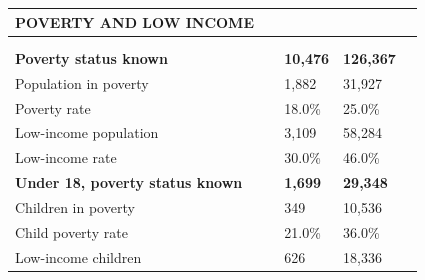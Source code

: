 \documentclass[9pt]{report}
\begin{document}
\vspace{12pt}
\setlength{\tabcolsep}{.01in} %
\begin{tabular}{p{.10in}p{.10in}p{.10in}p{3.7in}>{\hfill}p{.85in}>{\hfill}p{.85in}>{\hfill}p{.85in}>{\hfill}p{.85in}p{0.1in}}
\multicolumn{9}{l}{\parbox{7.1in}{\raggedright{\large{\strut\textbf{POVERTY AND LOW INCOME}\strut}}}} \\ 
\hline
\multicolumn{4}{l}{\parbox{3.5in}{\raggedright{\textbf{}}}} & \multicolumn{1}{r}{\parbox{.85in}{\strut\raggedleft{\textbf{}\strut}}} & \multicolumn{1}{r}{\parbox{.85in}{\strut\raggedleft{\textbf{}\strut}}} & \multicolumn{1}{r}{\parbox{.85in}{\strut{}}} & \multicolumn{1}{r}{\parbox{.85in}{\strut{}}} & \\ 
\multicolumn{9}{l}{} \\ 
\multicolumn{4}{l}{\parbox{3.5in}{\strut\raggedright{\textbf{Poverty status known}\strut}}} & \textbf{} & \textbf{} & \textbf{10,476} & \textbf{126,367} & \textbf{} \\ 
\multicolumn{4}{l}{\parbox{3.6in}{\strut\raggedright{{Population in poverty}}\strut}} &  &  & 1,882 & 31,927 & \multicolumn{1}{l}{}  \\ 
\multicolumn{4}{l}{\parbox{3.6in}{\strut\raggedright{{Poverty rate}}\strut}} &  &  & 18.0\% & 25.0\% & \multicolumn{1}{l}{}  \\ 
\multicolumn{4}{l}{\parbox{3.6in}{\strut\raggedright{{Low-income population}}\strut}} &  &  & 3,109 & 58,284 & \multicolumn{1}{l}{}  \\ 
\multicolumn{4}{l}{\parbox{3.6in}{\strut\raggedright{{Low-income rate}}\strut}} &  &  & 30.0\% & 46.0\% & \multicolumn{1}{l}{}  \\ 
\multicolumn{4}{l}{\parbox{3.5in}{\strut\raggedright{\textbf{Under 18, poverty status known}\strut}}} & \textbf{} & \textbf{} & \textbf{1,699} & \textbf{29,348} & \textbf{} \\ 
\multicolumn{4}{l}{\parbox{3.6in}{\strut\raggedright{{Children in poverty}}\strut}} &  &  & 349 & 10,536 & \multicolumn{1}{l}{}  \\ 
\multicolumn{4}{l}{\parbox{3.6in}{\strut\raggedright{{Child poverty rate}}\strut}} &  &  & 21.0\% & 36.0\% & \multicolumn{1}{l}{}  \\ 
\multicolumn{4}{l}{\parbox{3.6in}{\strut\raggedright{{Low-income children}}\strut}} &  &  & 626 & 18,336 & \multicolumn{1}{l}{}  \\ 

\end{tabular}
\end{document}
